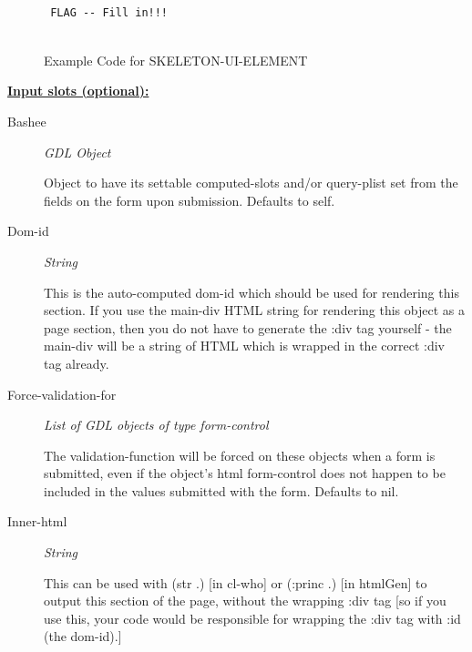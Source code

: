 \documentclass [11pt]{book}
\begin{document}
\begin{itemize}
\begin{figure}
\begin{lrbox}{\boxedverb}
\begin{minipage}{\linewidth}
{\begin{verbatim}

 FLAG -- Fill in!!!


\end{verbatim}}
\end{minipage}
\end{lrbox}
\fbox{\usebox{\boxedverb}}

\caption{Example Code for SKELETON-UI-ELEMENT}

\label{fig:example-code-SKELETON-UI-ELEMENT}

\end{figure}





\textbf{
\underline{Input slots (optional):}}

\begin{description}

\item [Bashee]
\emph{GDL Object}

 Object to have its settable computed-slots and/or query-plist set
from the fields on the form upon submission. Defaults to self.




\item [Dom-id]
\emph{String}

 This is the auto-computed dom-id which should be used for rendering
this section. If you use the main-div HTML string for rendering this object as a
page section, then you do not have to generate the :div tag yourself - the main-div
will be a string of HTML which is wrapped in the correct :div tag already.




\item [Force-validation-for]
\emph{List of GDL objects of type form-control}

 The validation-function will be forced
on these objects when a form is submitted, even if the object's html form-control does
not happen to be included in the values submitted with the form. Defaults to nil.




\item [Inner-html]
\emph{String}

 This can be used with (str .) [in cl-who] or (:princ .) [in htmlGen]
to output this section of the page, without the wrapping :div tag [so if you use this,
your code would be responsible for wrapping the :div tag with :id (the dom-id).]





\end{description}
\end{itemize}
\end{document}
